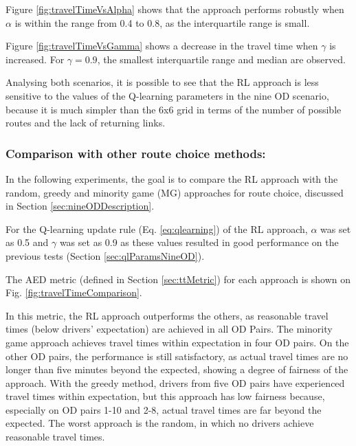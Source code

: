 \documentclass{RITA}
\begin{document}
Figure \ref{fig:travelTimeVsAlpha} shows that the approach performs robustly when $\alpha$ is within the range from 0.4 to 0.8, as the interquartile range is small.%

Figure \ref{fig:travelTimeVsGamma} shows a decrease in the travel time when $\gamma$ is increased. For $\gamma = 0.9$, the smallest interquartile range and median are observed.

Analysing both scenarios, it is possible to see that the RL approach is less sensitive to the values of the Q-learning parameters in the nine OD scenario, because it is much simpler than the 6x6 grid in terms of the number of possible routes and the lack of returning links. 

\subsubsection{Comparison with other route choice methods:}
\label{sec:comparison}
In the following experiments, the goal is to compare the RL approach with the random, greedy and minority game (MG) approaches for route choice, discussed in Section \ref{sec:nineODDescription}.

For the Q-learning update rule (Eq. \ref{eq:qlearning}) of the RL approach, $\alpha$ was set as 0.5 and $\gamma $ was set as 0.9 as these values resulted in good performance on the previous tests (Section \ref{sec:qlParamsNineOD}).

The AED metric (defined in Section \ref{sec:ttMetric}) for each approach is shown on Fig. \ref{fig:travelTimeComparison}. 

In this metric, the RL approach outperforms the others, as reasonable travel times (below drivers' expectation) are achieved in all OD Pairs. The minority game approach achieves travel times within expectation in four OD pairs. On the other OD pairs, the performance is still satisfactory, as actual travel times are no longer than five minutes beyond the expected, showing a degree of fairness of the approach. With the greedy method, drivers from five OD pairs have experienced travel times within expectation, but this approach has low fairness because, especially on OD pairs 1-10 and 2-8, actual travel times are far beyond the expected. The worst approach is the random, in which no drivers achieve reasonable travel times.
\end{document}
